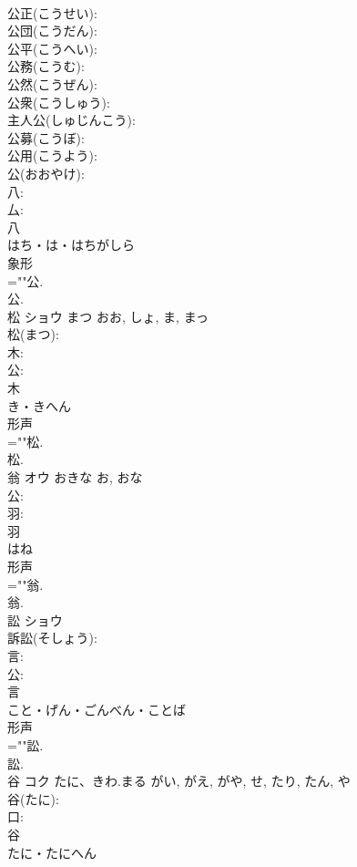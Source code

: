 \documentclass[8pt]{extreport}
\begin{document}
\begin{CJK}{UTF8}{min}
\\	公正(こうせい): 
\\	公団(こうだん): 
\\	公平(こうへい): 
\\	公務(こうむ): 
\\	公然(こうぜん): 
\\	公衆(こうしゅう): 
\\	主人公(しゅじんこう): 
\\	公募(こうぼ): 
\\	公用(こうよう): 
\\	公(おおやけ): 
\\	八: 
\\	厶: 
\\	八	
\\	はち・は・はちがしら	
\\	象形 
\\	=""公.
\\	公.
\\	松	ショウ	まつ	おお, しょ, ま, まっ	
\\	松(まつ): 
\\	木: 
\\	公: 
\\	木	
\\	き・きへん	
\\	形声 
\\	=""松.
\\	松.
\\	翁	オウ	おきな	お, おな	
\\	公: 
\\	羽: 
\\	羽	
\\	はね	
\\	形声 
\\	=""翁.
\\	翁.
\\	訟	ショウ			
\\	訴訟(そしょう): 
\\	言: 
\\	公: 
\\	言	
\\	こと・げん・ごんべん・ことば	
\\	形声 
\\	=""訟.
\\	訟.
\\	谷	コク	たに、きわ.まる	がい, がえ, がや, せ, たり, たん, や	
\\	谷(たに): 
\\	口: 
\\	谷	
\\	たに・たにへん	

\end{CJK}
\end{document}
